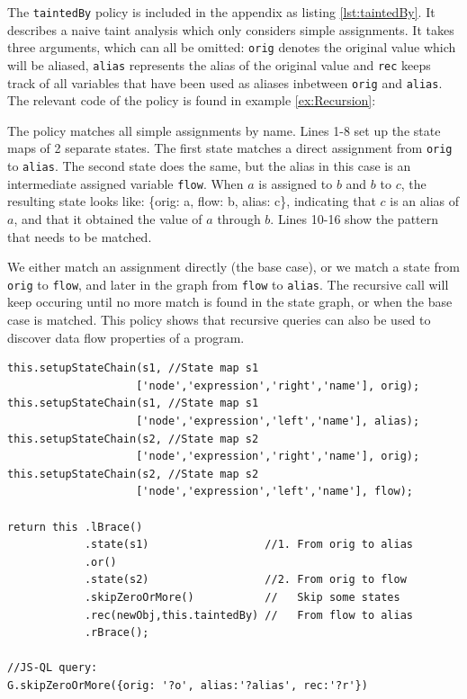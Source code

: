  The \texttt{taintedBy} policy is included in the appendix as listing \ref{lst:taintedBy}. It describes a naive taint analysis which only considers simple assignments. It takes three arguments, which can all be omitted: \texttt{orig} denotes the original value which will be aliased, \texttt{alias} represents the alias of the original value and \texttt{rec} keeps track of all variables that have been used as aliases inbetween \texttt{orig} and \texttt{alias}. The relevant code of the policy is found in example \ref{ex:Recursion}:

\begin{exmp}
\label{ex:Recursion}
The policy matches all simple assignments by name. Lines 1-8 set up the state maps of 2 separate states. The first state matches a direct assignment from \texttt{orig} to \texttt{alias}. The second state does the same, but the alias in this case is an intermediate assigned variable \texttt{flow}. When $a$ is assigned to $b$ and $b$ to $c$, the resulting state looks like: \{orig: a, flow: b, alias: c\}, indicating that $c$ is an alias of $a$, and that it obtained the value of $a$ through $b$. Lines 10-16 show the pattern that needs to be matched. 

We either match an assignment directly (the base case), or we match a state from \texttt{orig} to \texttt{flow}, and later in the graph from \texttt{flow} to \texttt{alias}. The recursive call will keep occuring until no more match is found in the state graph, or when the base case is matched. This policy shows that recursive queries can also be used to discover data flow properties of a program.

\begin{lstlisting}[label={lst:recursivePolicy},language=JSQL, caption=Recursive call of the \texttt{taintedBy} policy,mathescape=true]
this.setupStateChain(s1, //State map s1
                    ['node','expression','right','name'], orig); 
this.setupStateChain(s1, //State map s1
                    ['node','expression','left','name'], alias); 
this.setupStateChain(s2, //State map s2
                    ['node','expression','right','name'], orig);
this.setupStateChain(s2, //State map s2
                    ['node','expression','left','name'], flow);

return this .lBrace()
            .state(s1)                  //1. From orig to alias
            .or()
            .state(s2)                  //2. From orig to flow
            .skipZeroOrMore()           //   Skip some states
            .rec(newObj,this.taintedBy) //   From flow to alias
            .rBrace();

//JS-QL query:
G.skipZeroOrMore({orig: '?o', alias:'?alias', rec:'?r'})
\end{lstlisting}

\end{exmp}

